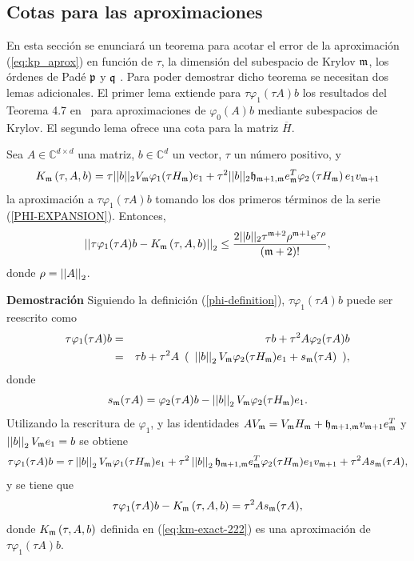  \subsection{Cotas para las aproximaciones}
 En esta sección se enunciará un teorema para acotar el error de la aproximación (\ref{eq:kp_aprox}) en función de $\tau$, la dimensión del subespacio de Krylov $\mathfrak{m}$, los órdenes de Padé $\mathfrak{p}$ y $\mathfrak{q}$ . Para poder demostrar dicho teorema se necesitan dos lemas adicionales. El primer lema extiende para $\tau \varphi_1(\tau A)b$ los resultados del Teorema 4.7 en~\cite{Saad92} para aproximaciones de $\varphi_0(A)b$ mediante subespacios de Krylov. El segundo lema ofrece una cota para la matriz $\overline{H}$.

 \begin{lemma}\cite{naranjo2021locally}\label{lemma:CORRECTED-ERROR}
	Sea $A\in\mathbb{C}^{d\times d}$ una matriz, $b\in\mathbb{C}^{d}$ un vector, $\tau$ un número positivo, y 
	\begin{equation}
		{K_{\mathfrak{m}}\left(\tau,A , b \right) = \tau ||b||_2 V_{\mathfrak{m}}\varphi_1(\tau H_{\mathfrak{m}})e_1}+\tau^2 ||b||_2 \mathfrak{h}_{\mathfrak{m}+1,\mathfrak{m}}e_{\mathfrak{m}}^T\varphi_2\left(\tau H_{\mathfrak{m}}\right) e_1 v_{\mathfrak{m}+1} \label{eq:km-exact-222}
	\end{equation}
	 la aproximación a $\tau \varphi_1(\tau A)b$ tomando los dos primeros términos de la serie (\ref{PHI-EXPANSION}). Entonces,
	\begin{gather*}
	\left\lvert\left\lvert \tau\varphi_1(\tau A)b - K_{\mf}\left(\tau,A , b \right) \right\rvert\right\rvert_2%
	\leq \frac{2\vert\lvert b \rvert\rvert_2\tau^{\mf+2}\rho^{\mf+1}\me{\tau \rho}}{(\mf+2)!},
	\end{gather*}
	donde $\rho=\left\lvert \left\lvert A \right\rvert \right\rvert_2$.
\end{lemma}
\textbf{Demostración}
Siguiendo la definición (\ref{phi-definition}), $\tau \varphi_1(\tau A)b$ puede ser reescrito como
\begin{eqnarray*}
	\tau \varphi_1(\tau A)b &=& \tau b+\tau^{2}A\varphi_{2}(\tau A)b \\
	&=& \tau b+\tau^{2}A \,\ (\,\ \nnorm{\nnorm{b}}_2V_\mf\varphi_{2}(\tau H_\mf)e_1 +s_\mf(\tau A) \,\ ), %
\end{eqnarray*}
donde \[ s_{\mathfrak{m}} (\tau A)= \varphi_{2}(\tau A)b -\left\lvert \left\lvert b \right\rvert \right\rvert_2V_{\mathfrak{m}}\varphi_{2}(\tau H_{\mathfrak{m}})e_1 .\]
Utilizando la rescritura de $\varphi_1$, y las identidades $AV_{\mathfrak{m}}=V_{\mathfrak{m}} H_{\mathfrak{m}} + \mathfrak{h}_{\mathfrak{m}+1,\mathfrak{m}}v_{\mathfrak{m}+1}e^{T}_{\mathfrak{m}}$ y  $\left\lvert \left\lvert b \right\rvert \right\rvert_2V_{\mathfrak{m}} e_1=b$ se obtiene
\begin{equation}
\tau\varphi_1(\tau A)b = \tau\nnorm{\nnorm{b}}_2V_\mf\varphi_1(\tau H_\mf)e_1 + \tau^{2}\nnorm{\nnorm{b}}_2\hf_{\mf+1,\mf}e^T_\mf\varphi_{2}(\tau H_\mf)e_1v_{\mf+1}+\tau^{2}As_\mf (\tau A), %
\end{equation}
y se tiene que
\begin{equation}
\tau\varphi_1(\tau A)b - K_{\mathfrak{m}}\left(\tau,A , b \right) = \tau^{2}As_{\mathfrak{m}}(\tau A), \label{eq:phidiffasm}
\end{equation}
donde $K_{\mathfrak{m}}\left(\tau,A , b \right)$ definida en (\ref{eq:km-exact-222}) es una aproximación de $\tau \varphi_1(\tau A)b$.

